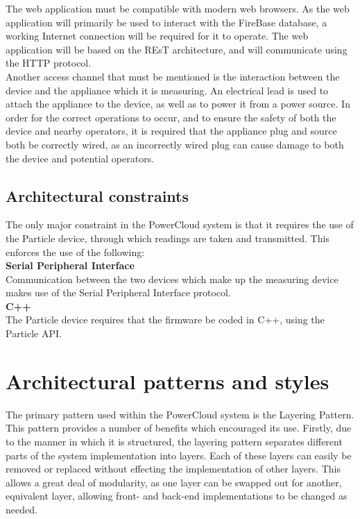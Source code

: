 \documentclass{article}
\begin{document}
	The web application must be compatible with modern web browsers. As the web application will primarily be used to interact with the FireBase database, a working Internet connection will be required for it to operate. The web application will be based on the REsT architecture, and will communicate using the HTTP protocol.\\
	
	Another access channel that must be mentioned is the interaction between the device and the appliance which it is measuring. An electrical lead is used to attach the appliance to the device, as well as to power it from a power source. In order for the correct operations to occur, and to ensure the safety of both the device and nearby operators, it is required that the appliance plug and source both be correctly wired, as an incorrectly wired plug can cause damage to both the device and potential operators.
	
	\subsection{Architectural constraints}
	
	The only major constraint in the PowerCloud system is that it requires the use of the Particle device, through which readings are taken and transmitted. This enforces the use of the following:\\
	
	\noindent\textbf{Serial Peripheral Interface}\\
	Communication between the two devices which make up the measuring device makes use of the Serial Peripheral Interface protocol.\\
	
	\noindent\textbf{C++}\\
	The Particle device requires that the firmware be coded in C++, using the Particle API.\\

\newpage

\section{Architectural patterns and styles}

The primary pattern used within the PowerCloud system is the Layering Pattern. This pattern provides a number of benefits which encouraged its use. Firstly, due to the manner in which it is structured, the layering pattern separates different parts of the system implementation into layers. Each of these layers can easily be removed or replaced without effecting the implementation of other layers. This allows a great deal of modularity, as one layer can be swapped out for another, equivalent layer, allowing front- and back-end implementations to be changed as needed.\\
\end{document}
